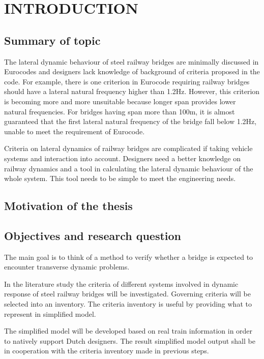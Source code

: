 
\chapter{INTRODUCTION}

\section{Summary of topic}

The lateral dynamic behaviour of steel railway bridges are minimally discussed in Eurocodes and designers lack knowledge of background of criteria proposed in the code. For example, there is one criterion in Eurocode requiring railway bridges should have a lateral natural frequency higher than 1.2Hz. However, this criterion is becoming more and more unsuitable because longer span provides lower natural frequencies. For bridges having span more than 100m, it is almost guaranteed that the first lateral natural frequency of the bridge fall below 1.2Hz, unable to meet the requirement of Eurocode. 

Criteria on lateral dynamics of railway bridges are complicated if taking vehicle systems and interaction into account. Designers need a better knowledge on railway dynamics and a tool in calculating the lateral dynamic behaviour of the whole system. This tool needs to be simple to meet the engineering needs.  

\section{Motivation of the thesis}


\section{Objectives and research question}\label{sec:introduction}

The main goal is to think of a method to verify whether a bridge is expected to encounter transverse dynamic problems. 

In the literature study the criteria of different systems involved in dynamic response of steel railway bridges will be investigated. Governing criteria will be selected into an inventory. The criteria inventory is useful by providing what to represent in simplified model. 

The simplified model will be developed based on real train information in order to natively support Dutch designers. The result simplified model output shall be in cooperation with the criteria inventory made in previous steps.

